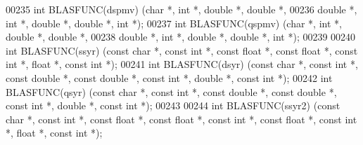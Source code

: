 \begin{DoxyCode}
00235 \textcolor{keywordtype}{int} BLASFUNC(dspmv) (\textcolor{keywordtype}{char} *, \textcolor{keywordtype}{int} *, \textcolor{keywordtype}{double}  *, \textcolor{keywordtype}{double} *,
00236              \textcolor{keywordtype}{double}  *, \textcolor{keywordtype}{int} *, \textcolor{keywordtype}{double} *, \textcolor{keywordtype}{double} *, \textcolor{keywordtype}{int} *);
00237 \textcolor{keywordtype}{int} BLASFUNC(qspmv) (\textcolor{keywordtype}{char} *, \textcolor{keywordtype}{int} *, \textcolor{keywordtype}{double}  *, \textcolor{keywordtype}{double} *,
00238              \textcolor{keywordtype}{double}  *, \textcolor{keywordtype}{int} *, \textcolor{keywordtype}{double} *, \textcolor{keywordtype}{double} *, \textcolor{keywordtype}{int} *);
00239 
00240 \textcolor{keywordtype}{int} BLASFUNC(ssyr) (\textcolor{keyword}{const} \textcolor{keywordtype}{char} *, \textcolor{keyword}{const} \textcolor{keywordtype}{int} *, \textcolor{keyword}{const} \textcolor{keywordtype}{float}   *, \textcolor{keyword}{const} \textcolor{keywordtype}{float}  *, \textcolor{keyword}{const} \textcolor{keywordtype}{int} *, \textcolor{keywordtype}{float}  *, \textcolor{keyword}{
      const} \textcolor{keywordtype}{int} *);
00241 \textcolor{keywordtype}{int} BLASFUNC(dsyr) (\textcolor{keyword}{const} \textcolor{keywordtype}{char} *, \textcolor{keyword}{const} \textcolor{keywordtype}{int} *, \textcolor{keyword}{const} \textcolor{keywordtype}{double}  *, \textcolor{keyword}{const} \textcolor{keywordtype}{double} *, \textcolor{keyword}{const} \textcolor{keywordtype}{int} *, \textcolor{keywordtype}{double} *, \textcolor{keyword}{
      const} \textcolor{keywordtype}{int} *);
00242 \textcolor{keywordtype}{int} BLASFUNC(qsyr) (\textcolor{keyword}{const} \textcolor{keywordtype}{char} *, \textcolor{keyword}{const} \textcolor{keywordtype}{int} *, \textcolor{keyword}{const} \textcolor{keywordtype}{double}  *, \textcolor{keyword}{const} \textcolor{keywordtype}{double} *, \textcolor{keyword}{const} \textcolor{keywordtype}{int} *, \textcolor{keywordtype}{double} *, \textcolor{keyword}{
      const} \textcolor{keywordtype}{int} *);
00243 
00244 \textcolor{keywordtype}{int} BLASFUNC(ssyr2) (\textcolor{keyword}{const} \textcolor{keywordtype}{char} *, \textcolor{keyword}{const} \textcolor{keywordtype}{int} *, \textcolor{keyword}{const} \textcolor{keywordtype}{float}   *, \textcolor{keyword}{const} \textcolor{keywordtype}{float}  *, \textcolor{keyword}{const} \textcolor{keywordtype}{int} *, \textcolor{keyword}{const} \textcolor{keywordtype}{float}  
      *, \textcolor{keyword}{const} \textcolor{keywordtype}{int} *, \textcolor{keywordtype}{float}  *, \textcolor{keyword}{const} \textcolor{keywordtype}{int} *);

\end{DoxyCode}
